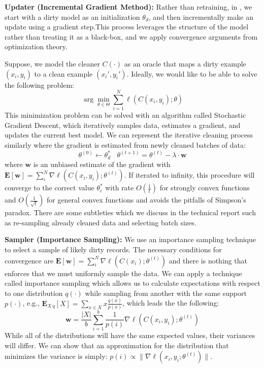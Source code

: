  \noindent\textbf{Updater (Incremental Gradient Method): } Rather than retraining, in \sys, we start with a dirty model as an initialization $\theta_d$, and then incrementally make an update using a gradient step.This process leverages the structure of the model rather than treating it as a black-box, and we apply convergence arguments from optimization theory.

Suppose, we model the cleaner $C(\cdot)$ as an oracle that maps a dirty example $(x_i,y_i)$ to a clean example $(x_i',y_i')$.
Ideally, we would like to be able to solve the following problem:
\[
\arg\min_{\theta \in \Theta} \sum_{i=1}^N \ell(C(x_i,y_i);\theta)
\]
This minimization problem can be solved with an algorithm called Stochastic Gradient Descent, which iteratively samples data, estimates a gradient, and updates the current best model.
We can represent the iterative cleaning process similarly where the gradient is estimated from newly cleaned batches of data:
\[
\theta^{(0)} \leftarrow \theta_d^{*}~~~~\theta^{(t+1)} = \theta^{(t)} - \lambda \cdot \mathbf{w}
\]
where $\mathbf{w}$ is an unbiased estimate of the gradient with $\mathbf{E}[\mathbf{w}]=\sum_i^N\nabla \ell(C(x_i,y_i);\theta^{(t)})$.
If iterated to infinity, this procedure will converge to the correct value $\theta_c^*$ with rate $O(\frac{1}{t})$ for strongly convex functions and $O(\frac{1}{\sqrt{t}})$ for general convex functions and avoids the pitfalls of Simpson's paradox.
There are some subtleties which we discuss in the technical report such as re-sampling already cleaned data and selecting batch sizes. 

  \vspace{0.5em}

  \noindent\textbf{Sampler (Importance Sampling): } We use an importance sampling technique to select a sample of likely dirty records. The necessary conditions for convergence are $\mathbf{E}[\mathbf{w}]=\sum_i^N\nabla \ell(C(x_i);\theta^{(t)})$ and there is nothing that enforces that we must uniformly sample the data.
We can apply a technique called importance sampling which allows us to calculate expectations with respect to one distribution $q(\cdot)$ while sampling from another with the same support $p(\cdot)$, e.g., $\mathbf{E}_{X~q}[X] = \sum_{x \in X} x \frac{q(x)}{p(x)}$, which leads the the following:
\[
\mathbf{w} = \frac{|X|}{b} \sum_{i=1}^{b} \frac{1}{p(i)} \nabla\ell(C(x_i,y_i);\theta^{(t)})
\]
While all of the distributions will have the same expected values, their variances will differ.
We can show that an approximation for the distribution that minimizes the variance is simply: 
$p(i) \propto \|\nabla\ell(x_i,y_i;\theta^{(t)})\|$.


